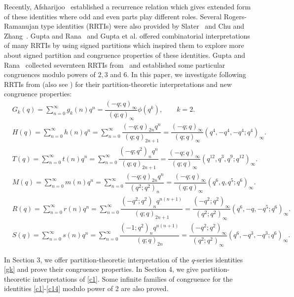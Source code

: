 \documentclass[12pt]{article}
\renewcommand{\(}{\left\(}
\renewcommand{\)}{\right\)}
\renewcommand{\[}{\left[}
\renewcommand{\]}{\right]}
\numberwithin{equation}{section}
\theoremstyle{plain}
\begin{document}
		 Recently, Afsharijoo~\cite{AP} established a recurrence relation which gives extended form of these identities where odd and even parts play different roles. Several Rogers-Ramanujan type identities (RRTIs) were also provided by Slater~\cite{SL} and Chu and Zhang~\cite{CW}. Gupta and Rana~\cite{RG1}  and Gupta et al. \cite{GRS} offered combinatorial interpretations of many RRTIs by using signed partitions which inspired them to explore more about signed partition and congruence properties of these identities. Gupta and Rana~\cite{GM1} collected severnteen RRTIs from~\cite{CW} and established some particular congruences modulo powers of $2, 3$ and $6$. 
		In this paper, we investigate following  RRTIs from \cite{CW} (also see \cite{GM1}) for their partition-theoretic interpretations and new congruence properties:  
		\begin{align}
		\label{gk}
		& G_k(q)=\sum_{n=0}^{\infty}g_{k}(n)q^n =\dfrac{(-q;q)_\infty}{(q;q)_\infty}\phi(q^k),\qquad k=2.\\
		\label{c1}
		& H(q)=\sum_{n=0}^{\infty}h(n)q^n=\sum_{n=0}^{\infty}\dfrac{(-q;q)_{2n}q^n}{(q;q)_{2n+1}}=\dfrac{(-q;q)_\infty}{(q;q)_\infty}(q^4,-q^4,-q^4;q^4)_\infty.
		\end{align}
		\begin{align}	
		\label{c7}
		& T(q)=\sum_{n=0}^{\infty}t(n)q^n=\sum_{n=0}^{\infty}\dfrac{(-q;q^2)_nq^n}{(q;q)_{2n+1}}=\dfrac{(-q;q)_\infty}{(q;q)_\infty}(q^{12},q^3,q^9;q^{12})_\infty.\\
		\label{c10}
		& M(q)=\sum_{n=0}^{\infty}m(n)q^n=\sum_{n=0}^{\infty}\dfrac{(-q;q)_{2n}q^n}{(q^2;q^2)_n}=\dfrac{(-q;q)_\infty}{(q;q)_\infty}(q^6,q,q^5;q^6)_\infty.\\
		\label{c12}
		& R(q)=\sum_{n=0}^{\infty}r(n)q^n=\sum_{n=0}^{\infty}\dfrac{(-q^2;q^2)_nq^{n(n+1)}}{(q;q)_{2n+1}}=\dfrac{(-q^2;q^2)_\infty}{(q^2;q^2)_\infty}(q^6,-q,-q^5;q^6)_\infty.\\
		\label{c14}
		& S(q)=\sum_{n=0}^{\infty}s(n)q^n=\sum_{n=0}^{\infty}\dfrac{(-1;q^2)_nq^{n(n+1)}}{(q;q)_{2n}}=\dfrac{(-q^2;q^2)_\infty}{(q^2;q^2)_\infty}(q^6,-q^3,-q^3;q^6)_\infty.
		\end{align}
		
		
		In Section 3, we offer partition-theoretic interpretation of the $q$-series identities \eqref{gk} and prove their congruence properties. In Section 4, we give partition-theoretic interpretations of \eqref{c1}. Some infinite families of congruence for the identities \eqref{c1}-\eqref{c14} modulo power of 2 are also proved. 
		
\end{document}
